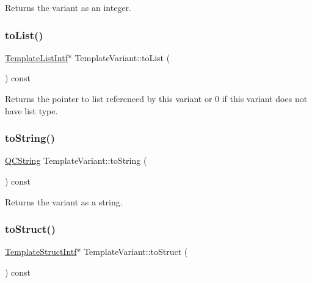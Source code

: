 Returns the variant as an integer. \mbox{\label{class_template_variant_a96c0c47020c05b88b1ad1dfc2b6961e2}} 
\subsubsection{\texorpdfstring{toList()}{toList()}}
{\footnotesize\ttfamily \mbox{\hyperlink{class_template_list_intf}{Template\+List\+Intf}}$\ast$ Template\+Variant\+::to\+List (\begin{DoxyParamCaption}{ }\end{DoxyParamCaption}) const\hspace{0.3cm}{\ttfamily [inline]}}

Returns the pointer to list referenced by this variant or 0 if this variant does not have list type. \mbox{\label{class_template_variant_ab03869d8a226d83614fca23902b0facd}} 
\subsubsection{\texorpdfstring{toString()}{toString()}}
{\footnotesize\ttfamily \mbox{\hyperlink{class_q_c_string}{Q\+C\+String}} Template\+Variant\+::to\+String (\begin{DoxyParamCaption}{ }\end{DoxyParamCaption}) const\hspace{0.3cm}{\ttfamily [inline]}}

Returns the variant as a string. \mbox{\label{class_template_variant_a999df05d683cfea696903ae116cb9fcc}} 
\subsubsection{\texorpdfstring{toStruct()}{toStruct()}}
{\footnotesize\ttfamily \mbox{\hyperlink{class_template_struct_intf}{Template\+Struct\+Intf}}$\ast$ Template\+Variant\+::to\+Struct (\begin{DoxyParamCaption}{ }\end{DoxyParamCaption}) const\hspace{0.3cm}{\ttfamily [inline]}}

